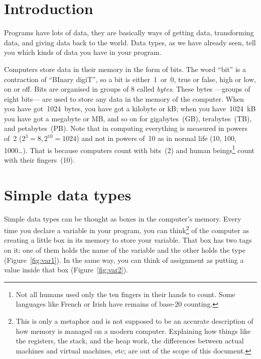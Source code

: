


%
%
%
%
%
%
%


\section{Introduction}
\label{sec:introduction}

Programs have lots of data, they are basically
ways of getting data, transforming data, and giving data back to the
world. 
%
Data types, as we have already seen, tell you which kinds of data you
have in your program. 

Computers store data in their memory in the form of bits. The word
``bit'' is a contraction of ``BInary digiT'', so a bit is
either~1~or~0, true or false, high or low, on or off. Bits are
organised in groups of 8 called \emph{bytes}. These bytes ---groups of
eight bits--- are used to store any data in the memory of the
computer. When you have got~1024~bytes, you have got a kilobyte or kB;
when you have~1024~kB you have got a megabyte or MB, and so on for
gigabytes~(GB), terabytes~(TB), and petabytes~(PB). Note that in
computing everything is measured in powers of~2 ($2^3 = 8, 2^{10} =
1024$) and not in powers of~10 as in normal life (10, 100,
1000\ldots). That is because 
computers count with bits~(2) and human beings\footnote{Not all humans
used only the ten fingers in their hands to count. Some languages like
French or Irish have remains of base-20 counting.} count with their
fingers~(10). 

\section{Simple data types}
\label{sec:simple-data-types}

Simple data types can be thought as boxes in the computer's
memory. Every time you declare a variable in your program, you can
think\footnote{This is only a metaphor and is not supposed to be an
  accurate description of how memory is managed on a modern
  computer. Explaining how things like the registers, the stack, and
  the heap work, the differences between actual machines and virtual
  machines, etc; are out of the scope of this document.} of the
computer as creating a little box in its memory to store your
variable. That box has two tags on it: one of them holds the name of
the variable and the other holds the type
(Figure~\ref{fig:var1}). In the same way, you can think of
assignment as putting a value inside that box (Figure~\ref{fig:var2}). 

